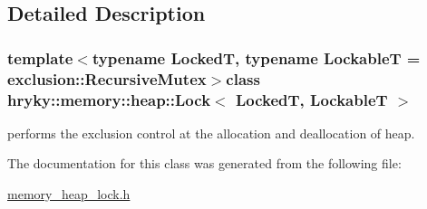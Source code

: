\subsection{Detailed Description}
\subsubsection*{template$<$typename Locked\-T, typename Lockable\-T = exclusion\-::\-Recursive\-Mutex$>$class hryky\-::memory\-::heap\-::\-Lock$<$ Locked\-T, Lockable\-T $>$}

performs the exclusion control at the allocation and deallocation of heap. 

The documentation for this class was generated from the following file\-:\begin{DoxyCompactItemize}
\item 
\hyperlink{memory__heap__lock_8h}{memory\-\_\-heap\-\_\-lock.\-h}\end{DoxyCompactItemize}
